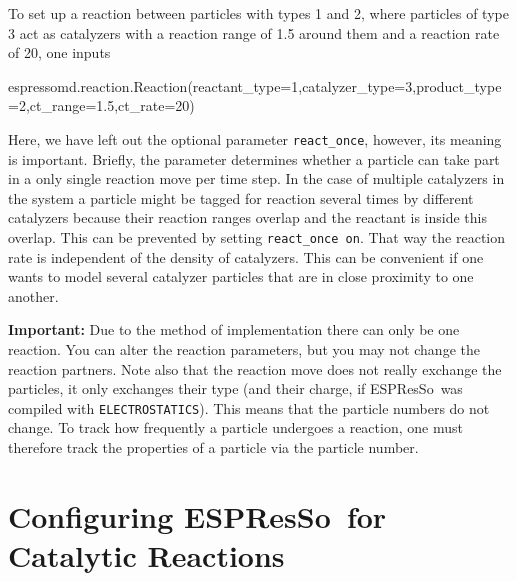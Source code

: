 \documentclass[aip,jcp,reprint,a4paper,onecolumn,nofootinbib,amsmath,amssymb]{revtex4-1}
\newcommand\code{\lstinline}
\newcommand{\es}{\mbox{\textsf{ESPResSo}}\xspace}
\newcommand\codees{\lstinline[language=python]}
\begin{document}
To set up a reaction between particles with types 1 and 2, where particles of type 3 act as catalyzers with a reaction range of 1.5 around them and a reaction rate of 20, one inputs
\begin{espresso}
espressomd.reaction.Reaction(reactant_type=1,catalyzer_type=3,product_type=2,ct_range=1.5,ct_rate=20)
\end{espresso}
Here, we have left out the optional parameter \codees{react_once}, however, its meaning is important. Briefly, the parameter determines whether a particle can take part in a only single reaction move per time step. In the case of multiple catalyzers in the system a particle might be tagged for reaction several times by different catalyzers because their reaction ranges overlap and the reactant is inside this overlap. This can be prevented by setting \code{react_once on}. That way the reaction rate is independent of the density of catalyzers. This can be convenient if one wants to model several catalyzer particles that are in close proximity to one another.

\noindent\textbf{Important:} Due to the method of implementation there can only be one reaction. You can alter the reaction parameters, but you may not change the reaction partners. Note also that the reaction move does not really exchange the particles, it only exchanges their type (and their charge, if \es\ was compiled with \code{ELECTROSTATICS}). This means that the particle numbers do not change. To track how frequently a particle undergoes a reaction, one must therefore track the properties of a particle via the particle number.

\section{Configuring \es\ for Catalytic Reactions}
\end{document}
